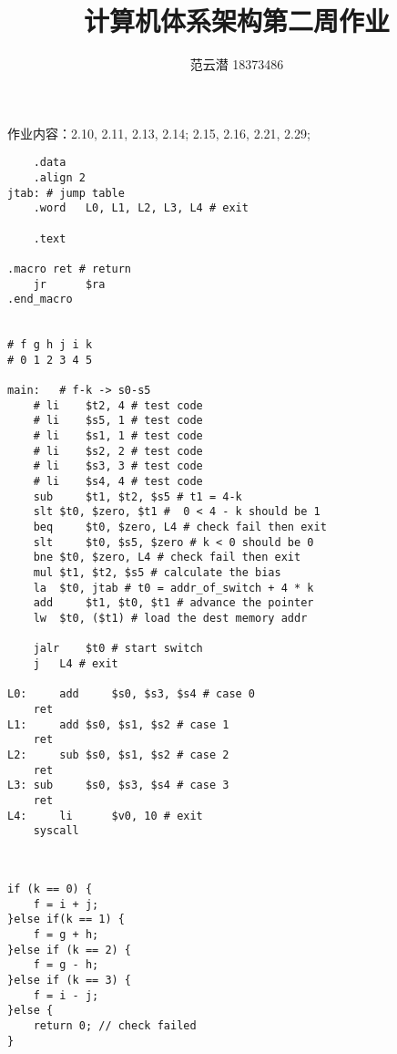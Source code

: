 \documentclass[lang=cn,11pt,a4paper,cite=authoryear]{elegantpaper}
\title{计算机体系架构\quad 第二周作业}
\author{范云潜 18373486}
\institute{微电子学院 184111 班}
\date{\zhtoday}
\begin{document}
\maketitle

作业内容：2.10, 2.11, 2.13, 2.14; 2.15, 2.16, 2.21, 2.29;




\begin{lstlisting}
    .data
	.align 2
jtab: # jump table
	.word	L0, L1, L2, L3, L4 # exit

	.text 

.macro ret # return 
	jr   	$ra
.end_macro 
	

# f g h j i k
# 0 1 2 3 4 5

main:	# f-k -> s0-s5
	# li	$t2, 4 # test code 
	# li	$s5, 1 # test code 
	# li	$s1, 1 # test code 
	# li	$s2, 2 # test code 
	# li	$s3, 3 # test code 
	# li	$s4, 4 # test code 
	sub 	$t1, $t2, $s5 # t1 = 4-k 
	slt	$t0, $zero, $t1	#  0 < 4 - k should be 1
	beq 	$t0, $zero, L4 # check fail then exit
	slt 	$t0, $s5, $zero # k < 0 should be 0 
	bne	$t0, $zero, L4 # check fail then exit
	mul	$t1, $t2, $s5 # calculate the bias 
	la	$t0, jtab # t0 = addr_of_switch + 4 * k
	add 	$t1, $t0, $t1 # advance the pointer
	lw	$t0, ($t1) # load the dest memory addr 
	
	jalr	$t0 # start switch 
	j 	L4 # exit 
	
L0: 	add 	$s0, $s3, $s4 # case 0
	ret 
L1: 	add	$s0, $s1, $s2 # case 1
	ret 
L2: 	sub	$s0, $s1, $s2 # case 2
	ret
L3:	sub 	$s0, $s3, $s4 # case 3
	ret 
L4: 	li      $v0, 10	# exit
	syscall			

	
\end{lstlisting}    



\begin{lstlisting}
if (k == 0) {
    f = i + j;
}else if(k == 1) {
    f = g + h;
}else if (k == 2) {
    f = g - h;
}else if (k == 3) {
    f = i - j;
}else {
    return 0; // check failed
}
\end{lstlisting}

\end{document}
